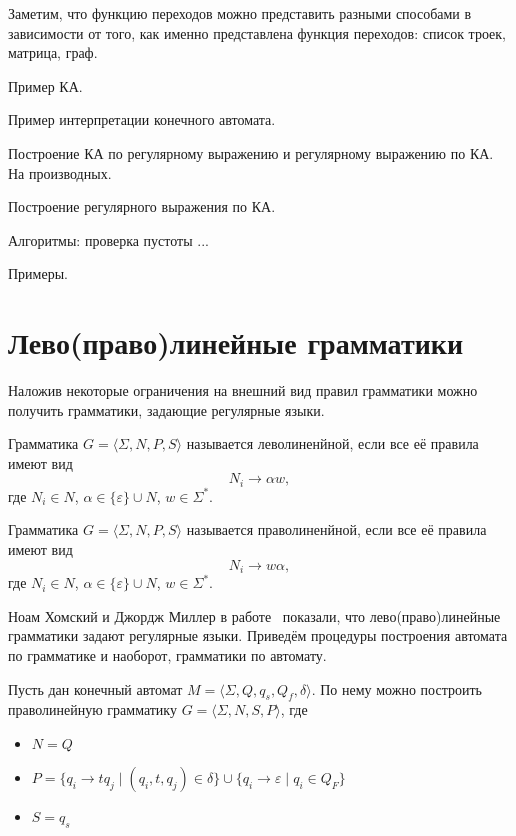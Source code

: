 Заметим, что функцию переходов можно представить разными способами в зависимости от того, как именно представлена функция переходов: список троек, матрица, граф.

\begin{example}
    Пример КА.

\end{example}

\begin{example}
    Пример интерпретации конечного автомата.
\end{example}

Построение КА по регулярному выражению и регулярному выражению по КА. На производных.

Построение регулярного выражения по КА.

Алгоритмы: проверка пустоты ...

Примеры.


\section{Лево(право)линейные грамматики}

Наложив некоторые ограничения на внешний вид правил грамматики можно получить грамматики, задающие регулярные языки.

\begin{definition}
    Грамматика $G=\langle \Sigma, N, P, S \rangle$ называется леволиненйной, если все её правила имеют вид
    \[N_i \to \alpha w,\]
    где $N_i \in N$, $\alpha \in \{\varepsilon\} \cup N$, $w \in \Sigma ^*$.
\end{definition}

\begin{definition}
    Грамматика $G=\langle \Sigma, N, P, S \rangle$ называется праволиненйной, если все её правила имеют вид
    \[N_i \to  w \alpha,\]
    где $N_i \in N$, $\alpha \in \{\varepsilon\} \cup N$, $w \in \Sigma ^*$.
\end{definition}

Ноам Хомский и Джордж Миллер в работе~ показали, что лево(право)линейные грамматики задают регулярные языки.
Приведём процедуры построения автомата по грамматике и наоборот, грамматики по автомату.

Пусть дан конечный автомат $M = \langle \Sigma, Q, q_s, Q_f, \delta \rangle$. По нему можно построить праволинейную грамматику $G=\langle \Sigma, N, S, P \rangle$, где
\begin{itemize}
    \item $N = Q$
    \item $P = \{ q_i \to t q_j \mid (q_i, t, q_j)\in \delta\} \cup \{ q_i \to \varepsilon \mid q_i \in Q_F\}$
    \item $S = q_s$
\end{itemize}

